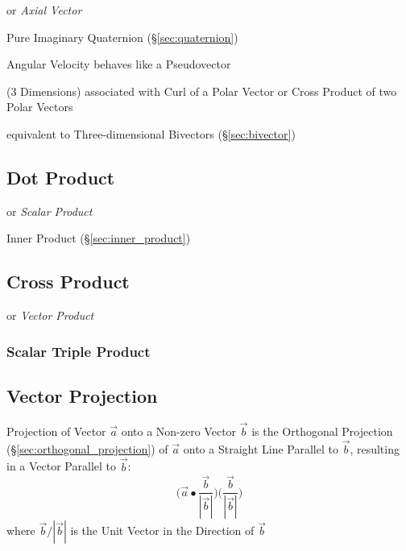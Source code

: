 or \emph{Axial Vector}

\fist Pure Imaginary Quaternion (\S\ref{sec:quaternion})

Angular Velocity behaves like a Pseudovector

(3 Dimensions) associated with Curl of a Polar Vector or Cross Product of two
Polar Vectors

equivalent to Three-dimensional Bivectors (\S\ref{sec:bivector})



\subsection{Dot Product}\label{sec:dot_product}

or \emph{Scalar Product}

Inner Product (\S\ref{sec:inner_product})



\subsection{Cross Product}\label{sec:cross_product}

or \emph{Vector Product}



\subsubsection{Scalar Triple Product}\label{sec:scalar_triple_product}



\subsection{Vector Projection}\label{sec:vector_projection}

Projection of Vector $\vec{a}$ onto a Non-zero Vector $\vec{b}$ is the
Orthogonal Projection (\S\ref{sec:orthogonal_projection}) of $\vec{a}$ onto a
Straight Line Parallel to $\vec{b}$, resulting in a Vector Parallel to
$\vec{b}$:
\[
  \big(\vec{a} \bullet \frac{\vec{b}}{|\vec{b}|}\big)
  \big(\frac{\vec{b}}{|\vec{b}|}\big)
\]
where $\vec{b}/|\vec{b}|$ is the Unit Vector in the Direction of $\vec{b}$

